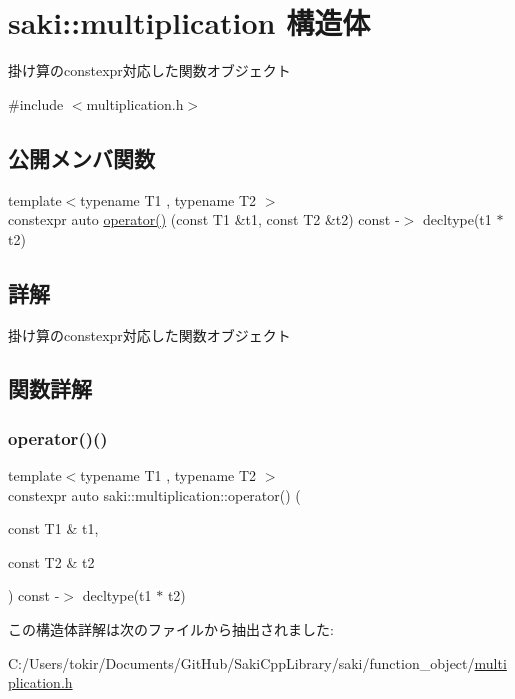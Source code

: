 \hypertarget{structsaki_1_1multiplication}{}\section{saki\+:\+:multiplication 構造体}
\label{structsaki_1_1multiplication}


掛け算のconstexpr対応した関数オブジェクト  




{\ttfamily \#include $<$multiplication.\+h$>$}

\subsection*{公開メンバ関数}
\begin{DoxyCompactItemize}
\item 
{\footnotesize template$<$typename T1 , typename T2 $>$ }\\constexpr auto \mbox{\hyperlink{structsaki_1_1multiplication_a064e2d28b9933a03efeaa2c2832fb274}{operator()}} (const T1 \&t1, const T2 \&t2) const -\/$>$ decltype(t1 $\ast$t2)
\end{DoxyCompactItemize}


\subsection{詳解}
掛け算のconstexpr対応した関数オブジェクト 

\subsection{関数詳解}
\mbox{\label{structsaki_1_1multiplication_a064e2d28b9933a03efeaa2c2832fb274}} 
\subsubsection{\texorpdfstring{operator()()}{operator()()}}
{\footnotesize\ttfamily template$<$typename T1 , typename T2 $>$ \\
constexpr auto saki\+::multiplication\+::operator() (\begin{DoxyParamCaption}\item[{const T1 \&}]{t1,  }\item[{const T2 \&}]{t2 }\end{DoxyParamCaption}) const -\/$>$ decltype(t1 $\ast$ t2)
		\hspace{0.3cm}{\ttfamily [inline]}}



この構造体詳解は次のファイルから抽出されました\+:\begin{DoxyCompactItemize}
\item 
C\+:/\+Users/tokir/\+Documents/\+Git\+Hub/\+Saki\+Cpp\+Library/saki/function\+\_\+object/\mbox{\hyperlink{multiplication_8h}{multiplication.\+h}}\end{DoxyCompactItemize}
